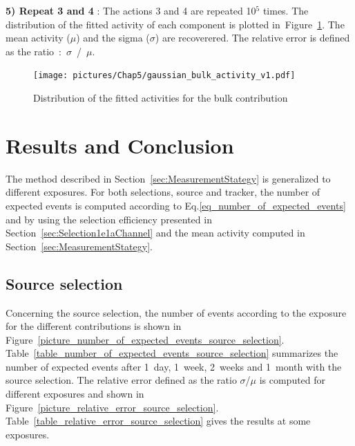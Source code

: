 \documentclass[main.tex]{subfiles}
\begin{document}
\bigskip


\noindent \textbf{5) Repeat 3 and 4} : The actions 3 and 4 are repeated 10$^\text{5}$ times. The distribution of the fitted activity of each component is plotted in~Figure~\ref{gaus}. The mean activity ($\mu$) and the sigma ($\sigma$) are recoverered. The relative error is defined as the ratio~:~$\sigma$~/~$\mu$.

\begin{figure}[h!]
\begin{center}
\texttt{[image: pictures/Chap5/gaussian\_bulk\_activity\_v1.pdf]}
\caption{Distribution of the fitted activities for the bulk contribution}
\label{gaus}
\end{center}
\end{figure}


\FloatBarrier




\section{Results and Conclusion}\label{sec:Results}


\noindent The method described in Section~\ref{sec:MeasurementStategy} is generalized to different exposures. For both selections, source and tracker, the number of expected events is computed according to Eq.\ref{eq_number_of_expected_events} and by using the selection efficiency presented in Section~\ref{sec:Selection1e1aChannel} and the mean activity computed in Section~\ref{sec:MeasurementStategy}.


\subsection{Source selection}


\NI Concerning the source selection, the number of events according to the exposure for the different contributions is shown in Figure~\ref{picture_number_of_expected_events_source_selection}. Table~\ref{table_number_of_expected_events_source_selection} summarizes the number of expected events after 1~day, 1~week, 2~weeks and 1~month with the source selection. The relative error defined as the ratio $\sigma$/$\mu$ is computed for different exposures and shown in Figure~\ref{picture_relative_error_source_selection}. Table~\ref{table_relative_error_source_selection} gives the results at some exposures.
\end{document}
